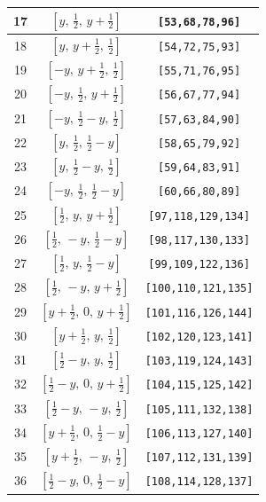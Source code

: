 \documentclass[fleqn,8pt]{jsarticle}
\begin{document}
\begin{longtable}{ccc}
17 & $\left[ y,\, \frac{1}{2},\, y + \frac{1}{2} \right]$ & {\tt [53,68,78,96]} \\ \hline
18 & $\left[ y,\, y + \frac{1}{2},\, \frac{1}{2} \right]$ & {\tt [54,72,75,93]} \\ \hline
19 & $\left[ - y,\, y + \frac{1}{2},\, \frac{1}{2} \right]$ & {\tt [55,71,76,95]} \\ \hline
20 & $\left[ - y,\, \frac{1}{2},\, y + \frac{1}{2} \right]$ & {\tt [56,67,77,94]} \\ \hline
21 & $\left[ - y,\, \frac{1}{2} - y,\, \frac{1}{2} \right]$ & {\tt [57,63,84,90]} \\ \hline
22 & $\left[ y,\, \frac{1}{2},\, \frac{1}{2} - y \right]$ & {\tt [58,65,79,92]} \\ \hline
23 & $\left[ y,\, \frac{1}{2} - y,\, \frac{1}{2} \right]$ & {\tt [59,64,83,91]} \\ \hline
24 & $\left[ - y,\, \frac{1}{2},\, \frac{1}{2} - y \right]$ & {\tt [60,66,80,89]} \\ \hline
25 & $\left[ \frac{1}{2},\, y,\, y + \frac{1}{2} \right]$ & {\tt [97,118,129,134]} \\ \hline
26 & $\left[ \frac{1}{2},\, - y,\, \frac{1}{2} - y \right]$ & {\tt [98,117,130,133]} \\ \hline
27 & $\left[ \frac{1}{2},\, y,\, \frac{1}{2} - y \right]$ & {\tt [99,109,122,136]} \\ \hline
28 & $\left[ \frac{1}{2},\, - y,\, y + \frac{1}{2} \right]$ & {\tt [100,110,121,135]} \\ \hline
29 & $\left[ y + \frac{1}{2},\, 0,\, y + \frac{1}{2} \right]$ & {\tt [101,116,126,144]} \\ \hline
30 & $\left[ y + \frac{1}{2},\, y,\, \frac{1}{2} \right]$ & {\tt [102,120,123,141]} \\ \hline
31 & $\left[ \frac{1}{2} - y,\, y,\, \frac{1}{2} \right]$ & {\tt [103,119,124,143]} \\ \hline
32 & $\left[ \frac{1}{2} - y,\, 0,\, y + \frac{1}{2} \right]$ & {\tt [104,115,125,142]} \\ \hline
33 & $\left[ \frac{1}{2} - y,\, - y,\, \frac{1}{2} \right]$ & {\tt [105,111,132,138]} \\ \hline
34 & $\left[ y + \frac{1}{2},\, 0,\, \frac{1}{2} - y \right]$ & {\tt [106,113,127,140]} \\ \hline
35 & $\left[ y + \frac{1}{2},\, - y,\, \frac{1}{2} \right]$ & {\tt [107,112,131,139]} \\ \hline
36 & $\left[ \frac{1}{2} - y,\, 0,\, \frac{1}{2} - y \right]$ & {\tt [108,114,128,137]} \\ \hline

\end{longtable}
\end{document}
